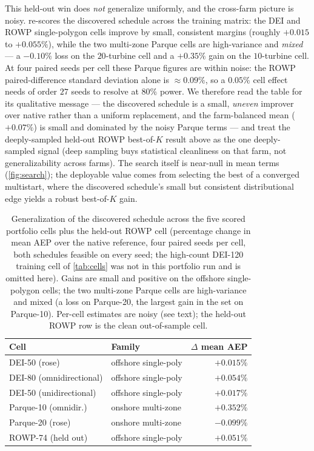 \documentclass[11pt]{article}
\begin{document}
This held-out win does \emph{not} generalize uniformly, and the cross-farm picture is
noisy.  re-scores the discovered schedule across the training
matrix: the DEI and ROWP single-polygon cells improve by small, consistent margins
(roughly $+0.015$ to $+0.055\%$), while the two multi-zone Parque cells are high-variance
and \emph{mixed} --- a $-0.10\%$ loss on the $20$-turbine cell and a $+0.35\%$ gain on the
$10$-turbine cell. At four paired seeds per cell these Parque figures are within noise:
the ROWP paired-difference standard deviation alone is $\approx0.09\%$, so a $0.05\%$ cell
effect needs of order $27$ seeds to resolve at $80\%$ power. We therefore read the table
for its qualitative message --- the discovered schedule is a small, \emph{uneven} improver
over native rather than a uniform replacement, and the farm-balanced mean ($+0.07\%$) is
small and dominated by the noisy Parque terms --- and treat the deeply-sampled held-out
ROWP best-of-$K$ result above as the one deeply-sampled signal (deep sampling buys
statistical cleanliness on that farm, not generalizability across farms). The search itself is near-null in
mean terms (\cref{fig:search}); the deployable value comes from selecting the best of a
converged multistart, where the discovered schedule's small but consistent distributional
edge yields a robust best-of-$K$ gain.

\begin{table}[t]
\centering
\small
\caption{Generalization of the discovered schedule across the five scored portfolio cells
plus the held-out ROWP cell (percentage change in mean AEP over the native reference, four
paired seeds per cell, both schedules feasible on every seed; the high-count DEI-120
training cell of \cref{tab:cells} was not in this portfolio run and is omitted here).
Gains are small and positive on the offshore
single-polygon cells; the two multi-zone Parque cells are high-variance and mixed (a loss
on Parque-20, the largest gain in the set on Parque-10). Per-cell
estimates are noisy (see text); the held-out ROWP row is the clean out-of-sample cell.}
\label{tab:generalization}
\begin{tabular}{@{}llr@{}}
\toprule
Cell & Family & $\Delta$ mean AEP \\
\midrule
DEI-50 (rose)            & offshore single-poly & $+0.015\%$ \\
DEI-80 (omnidirectional) & offshore single-poly & $+0.054\%$ \\
DEI-50 (unidirectional)  & offshore single-poly & $+0.017\%$ \\
Parque-10 (omnidir.)     & onshore multi-zone   & $+0.352\%$ \\
Parque-20 (rose)         & onshore multi-zone   & $-0.099\%$ \\
\midrule
ROWP-74 (held out)       & offshore single-poly & $+0.051\%$ \\
\bottomrule
\end{tabular}
\end{table}
\end{document}
